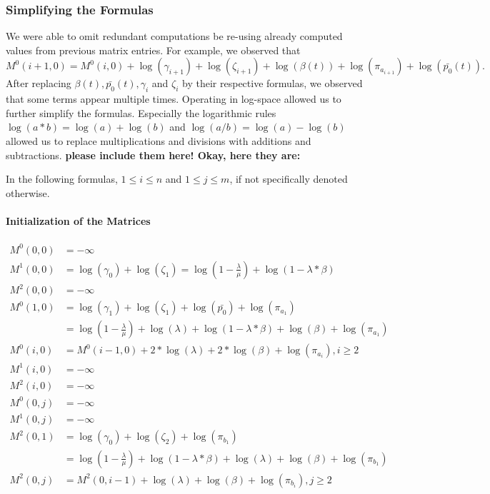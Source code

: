 \documentclass[runningheads,a4paper]{llncs}
\begin{document}
\subsubsection{Simplifying the Formulas}  
We were able to omit redundant computations be re-using already computed values from previous matrix entries.
For example, we observed that $$M^0(i+1,0) = M^0(i,0) + \log(\gamma_{i+1}) + \log(\zeta_{i+1}) + \log(\beta(t)) + \log(\pi_{a_{i+1}}) + \log(\bar{p_0}(t)).$$
After replacing $\beta(t), \bar{p_0}(t), \gamma_i$ and $\zeta_i$ by their respective formulas, we observed that some terms appear multiple times. 
Operating in log-space allowed us to further simplify the formulas. Especially the logarithmic rules $\log(a*b) = \log(a) + \log(b)$ and $\log(a/b) = \log(a) - \log(b)$ 
allowed us to replace multiplications and divisions with additions and subtractions.
{\bf please include them here! Okay, here they are:}

In the following formulas, $1 \leq i \leq n$ and $1 \leq j \leq m$, if not specifically denoted otherwise.

\paragraph{Initialization of the Matrices}
\label{sec:formulas:init}
\begin{align*}
M^0(0,0) &= -\infty \\
M^1(0,0) &= \log(\gamma_0) + \log(\zeta_1)
		= \log(1-\frac{\lambda}{\mu}) + \log (1 - \lambda * \beta) \\
M^2(0,0) &= -\infty \\
M^0(1,0) &= \log(\gamma_1) + \log(\zeta_1) + \log(\bar{p_0}) + \log(\pi_{a_1}) \\
		&= \log(1- \frac{\lambda}{\mu}) + \log(\lambda) + \log(1- \lambda *\beta) + \log(\beta) + \log(\pi_{a_1}) \\
M^0(i,0) &= M^0(i-1,0) + 2*\log(\lambda) + 2*\log(\beta) + \log(\pi_{a_i}), i \geq 2 \\
M^1(i,0) &= -\infty \\
M^2(i,0) &= -\infty \\
M^0(0,j) &= -\infty \\
M^1(0,j) &= -\infty \\
M^2(0,1) &= \log(\gamma_0) + \log(\zeta_2) + \log(\pi_{b_1}) \\
		&= \log(1- \frac{\lambda}{\mu}) + \log(1-\lambda*\beta) + \log(\lambda) + \log(\beta) + \log(\pi_{b_1}) \\
M^2(0,j) &= M^2(0, i-1) + \log(\lambda) + \log(\beta) + \log(\pi_{b_i}), j \geq 2 \\
\end{align*}
\end{document}
